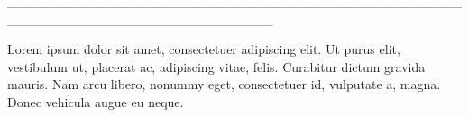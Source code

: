 \pagestyle{indice}

\vspace*{.5cm}

{}

\vspace{.5cm}

{}


\hspace*{-1.5cm}\_\_\_\_\_\_\_\_\_\_\_\_\_\_\_\_\_\_\_\_\_\_\_\_\_\_\_\_\_\_\_\_\_\_\_\_\_\_\_\_\_\_\_\_\_\_\_\_\_\_\_\_\_\_\_\_\_\_\_\_\_\_\_\_\_\_\_\_\_\_\_\_\_\_\_\_

\vspace{1cm}

\hspace*{-.5cm}\parbox{150pt}{\raggedright Lorem ipsum dolor sit amet, consectetuer
adipiscing elit. Ut purus elit, vestibulum ut,
placerat ac, adipiscing vitae, felis. Curabitur
dictum gravida mauris. Nam arcu libero,
nonummy eget, consectetuer id, vulputate a,
magna. Donec vehicula augue eu neque.} %

